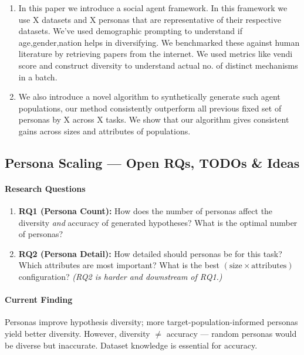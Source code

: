 \begin{enumerate}
\begin{enumerate}
\item In this paper we introduce a social agent framework. In this framework we use X datasets and X personas that are representative of their respective datasets. We've used demographic prompting to understand if age,gender,nation helps in diversifying. We benchmarked these against human literature by retrieving papers from the internet. We used metrics like vendi score and construct diversity to understand actual no. of distinct mechanisms in a batch.

\item We also introduce a novel algorithm to synthetically generate such agent populations, our method consistently outperform all previous fixed set of personas by X across X tasks. We show that our algorithm gives consistent gains across sizes and attributes of populations.
\end{enumerate} 
\end{enumerate}

\subsection{Persona Scaling — Open RQs, TODOs \& Ideas}

\paragraph{Research Questions}
\begin{enumerate}
    \item \textbf{RQ1 (Persona Count):} How does the number of personas affect the diversity \emph{and} accuracy of generated hypotheses? What is the optimal number of personas?
    \item \textbf{RQ2 (Persona Detail):} How detailed should personas be for this task? Which attributes are most important? What is the best $(\text{size} \times \text{attributes})$ configuration?
    \emph{(RQ2 is harder and downstream of RQ1.)}
\end{enumerate}

\paragraph{Current Finding}
Personas improve hypothesis diversity; more target-population-informed personas yield better diversity. However, diversity $\neq$ accuracy — random personas would be diverse but inaccurate. Dataset knowledge is essential for accuracy.


